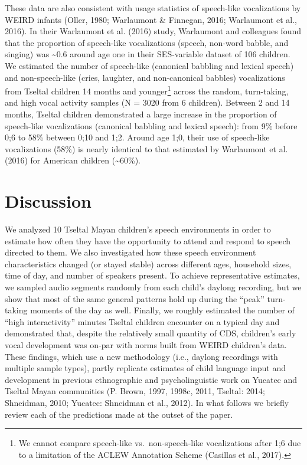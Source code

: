 \documentclass[floatsintext,man]{apa6}
\theoremstyle{definition}
\theoremstyle{definition}
\theoremstyle{definition}
\theoremstyle{remark}
\begin{document}
These data are also consistent with usage statistics of speech-like
vocalizations by WEIRD infants (Oller, 1980; Warlaumont \& Finnegan,
2016; Warlaumont et al., 2016). In their Warlaumont et al. (2016) study,
Warlaumont and colleagues found that the proportion of speech-like
vocalizations (speech, non-word babble, and singing) was
\textasciitilde{}0.6 around age one in their SES-variable dataset of 106
children. We estimated the number of speech-like (canonical babbling and
lexical speech) and non-speech-like (cries, laughter, and non-canonical
babbles) vocalizations from Tseltal children 14 months and
younger\footnote{We cannot compare speech-like vs.~non-speech-like
  vocalizations after 1;6 due to a limitation of the ACLEW Annotation
  Scheme (Casillas et al., 2017).} across the random, turn-taking, and
high vocal activity samples (N = 3020 from 6 children). Between 2 and 14
months, Tseltal children demonstrated a large increase in the proportion
of speech-like vocalizations (canonical babbling and lexical speech):
from 9\% before 0;6 to 58\% between 0;10 and 1;2. Around age 1;0, their
use of speech-like vocalizations (58\%) is nearly identical to that
estimated by Warlaumont et al. (2016) for American children
(\textasciitilde{}60\%).

\section{Discussion}\label{disc}

We analyzed 10 Tseltal Mayan children's speech environments in order to
estimate how often they have the opportunity to attend and respond to
speech directed to them. We also investigated how these speech
environment characteristics changed (or stayed stable) across different
ages, household sizes, time of day, and number of speakers present. To
achieve representative estimates, we sampled audio segments randomly
from each child's daylong recording, but we show that most of the same
general patterns hold up during the \enquote{peak} turn-taking moments
of the day as well. Finally, we roughly estimated the number of
\enquote{high interactivity} minutes Tseltal children encounter on a
typical day and demonstrated that, despite the relatively small quantity
of CDS, children's early vocal development was on-par with norms built
from WEIRD children's data. These findings, which use a new methodology
(i.e., daylong recordings with multiple sample types), partly replicate
estimates of child language input and development in previous
ethnographic and psycholinguistic work on Yucatec and Tseltal Mayan
communities (P. Brown, 1997, 1998c, 2011, Tseltal: 2014; Shneidman,
2010; Yucatec: Shneidman et al., 2012). In what follows we briefly
review each of the predictions made at the outset of the paper.
\end{document}
